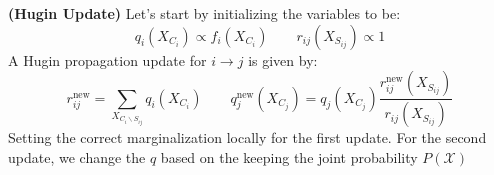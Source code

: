 \begin{definition}{\textbf{(Hugin Update)}}
    Let's start by initializing the variables to be:
    \begin{equation*}
        q_i(X_{C_i}) \propto f_i(X_{C_i}) \qquad r_{ij}(X_{S_{ij}}) \propto 1
    \end{equation*}
    A Hugin propagation update for $i\rightarrow j$ is given by:
    \begin{equation*}
        r^\text{new}_{ij} = \sum_{X_{C_i\backslash S_{ij}}}q_i(X_{C_i}) \qquad q^\text{new}_j(X_{C_j}) = q_j(X_{C_j})\frac{r^\text{new}_{ij}(X_{S_{ij}})}{r_{ij}(X_{S_{ij}})}
    \end{equation*}
    Setting the correct marginalization locally for the first update. For the second update, we change the $q$ based on the keeping the joint probability $P(\mathcal{X})$
\end{definition}

